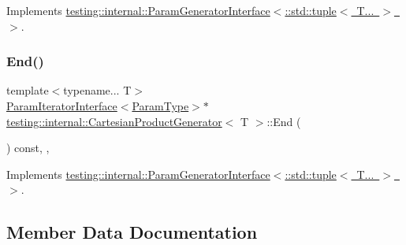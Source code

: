 Implements \mbox{\hyperlink{classtesting_1_1internal_1_1_param_generator_interface_afa7211b74990e11d3fc7ad4e7113da4f}{testing\+::internal\+::\+Param\+Generator\+Interface$<$\+::std\+::tuple$<$ T... $>$ $>$}}.

\mbox{\label{classtesting_1_1internal_1_1_cartesian_product_generator_ae072dcf8400ac9dd5692e417262a664b}} 
\subsubsection{\texorpdfstring{End()}{End()}\hspace{0.1cm}{\footnotesize\ttfamily [2/2]}}
{\footnotesize\ttfamily template$<$typename... T$>$ \\
\mbox{\hyperlink{classtesting_1_1internal_1_1_param_iterator_interface}{Param\+Iterator\+Interface}}$<$\mbox{\hyperlink{classtesting_1_1internal_1_1_cartesian_product_generator_af27131157a9347f0c82420ca081ee7dd}{Param\+Type}}$>$$\ast$ \mbox{\hyperlink{classtesting_1_1internal_1_1_cartesian_product_generator}{testing\+::internal\+::\+Cartesian\+Product\+Generator}}$<$ T $>$\+::End (\begin{DoxyParamCaption}{ }\end{DoxyParamCaption}) const\hspace{0.3cm}{\ttfamily [inline]}, {\ttfamily [override]}, {\ttfamily [virtual]}}



Implements \mbox{\hyperlink{classtesting_1_1internal_1_1_param_generator_interface_afa7211b74990e11d3fc7ad4e7113da4f}{testing\+::internal\+::\+Param\+Generator\+Interface$<$\+::std\+::tuple$<$ T... $>$ $>$}}.



\subsection{Member Data Documentation}
\mbox{\label{classtesting_1_1internal_1_1_cartesian_product_generator_a6d66e88da1c3675e07d02985aa842f3a}} 
